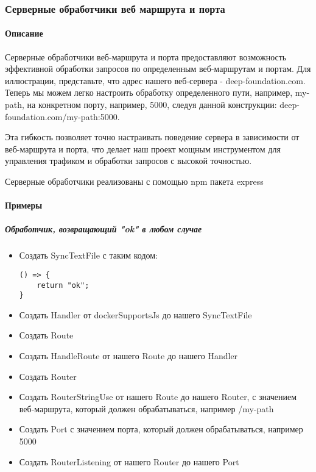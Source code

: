 \documentclass{article}
\begin{document}
\subsubsection{Серверные обработчики веб маршрута и порта}
\paragraph{Описание}
Серверные обработчики веб-маршрута и порта предоставляют возможность
эффективной обработки запросов по определенным веб-маршрутам и портам. Для
иллюстрации, представьте, что адрес нашего веб-сервера - deep-foundation.com.
Теперь мы можем легко настроить обработку определенного пути, например,
my-path, на конкретном порту, например, 5000, следуя данной конструкции:
deep-foundation.com/my-path:5000.

Эта гибкость позволяет точно настраивать поведение сервера в зависимости от
веб-маршрута и порта, что делает наш проект мощным инструментом для управления
трафиком и обработки запросов с высокой точностью.

Серверные обработчики реализованы с помощью npm пакета express
\paragraph{Примеры}
\subparagraph{Обработчик, возвращающий "ok" в любом случае}
\begin{itemize}
  \item Создать SyncTextFile с таким кодом:
        \begin{lstlisting}
() => {
    return "ok";
}
\end{lstlisting}
  \item Создать Handler от dockerSupportsJs до нашего SyncTextFile
  \item Создать Route
  \item Создать HandleRoute от нашего Route до нашего Handler
  \item Создать Router
  \item Создать RouterStringUse от нашего Route до нашего Router, с значением
        веб-маршрута, который должен обрабатываться, например /my-path
  \item Создать Port с значением порта, который должен обрабатываться, например
        5000
  \item Создать RouterListening от нашего Router до нашего Port
\end{itemize}
\end{document}
